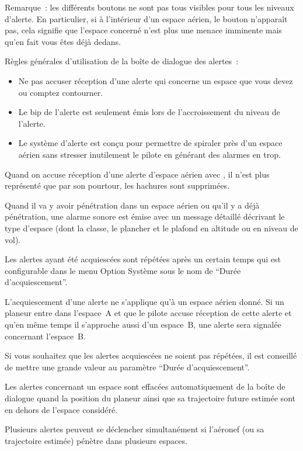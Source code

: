 Remarque~: les différents boutons ne sont pas tous visibles pour tous les niveaux d'alerte. En particulier, si à l'intérieur d'un espace aérien, le bouton  n'apparaît pas, cela signifie que l'espace concerné n'est plus une menace imminente mais qu'en fait vous êtes déjà dedans.

Règles générales d'utilisation de la boîte de dialogue des alertes~:
\begin{itemize}
\item Ne pas accuser réception d'une alerte qui concerne un espace que vous devez ou comptez contourner.
\item Le bip de l'alerte est seulement émis lors de l'accroissement du niveau de l'alerte.
\item Le système d'alerte est conçu pour permettre de spiraler près d'un espace aérien sans stresser inutilement le pilote en générant des alarmes en trop.
\end{itemize}

Quand on accuse réception d'une alerte d'espace aérien avec , il n'est plus représenté que par son pourtour, les hachures sont supprimées.

Quand il va y avoir pénétration dans un espace aérien ou qu'il y a déjà pénétration, une alarme sonore est émise avec un message détaillé décrivant le type d'espace (dont la classe, le plancher et le plafond en altitude ou en niveau de vol).

Les alertes ayant été acquiescées sont répétées après un certain temps qui est configurable dans le menu Option Système sous le nom de ``Durée d'acquiescement''.

L'acquiescement d'une alerte ne s'applique qu'à un espace aérien donné. Si un planeur entre dans l'espace~A et que le pilote accuse réception de cette alerte et qu'en même temps il s'approche aussi d'un espace~B, une alerte sera signalée concernant l'espace~B.

\tip Si vous souhaitez que les alertes acquiescées ne soient pas répétées, il est conseillé de mettre une grande valeur au paramètre ``Durée d'acquiescement''.

Les alertes concernant un espace sont effacées automatiquement de la boîte de dialogue quand la position du planeur ainsi que sa trajectoire future estimée sont en dehors de l'espace considéré.

Plusieurs alertes peuvent se déclencher simultanément si l'aéronef (ou sa trajectoire estimée) pénètre dans plusieurs espaces.


